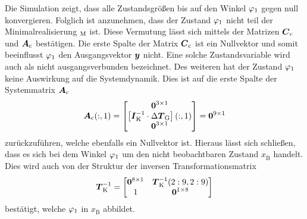 \pagebreak
Die Simulation zeigt, dass alle Zustandsgrößen bis auf den Winkel $\varphi_{\text{1}}$ gegen null konvergieren. Folglich ist anzunehmen, dass der Zustand $\varphi_{\text{1}}$ nicht teil der Minimalrealisierung $_{\text{M}}$ ist. Diese Vermutung lässt sich mittels der Matrizen $\boldsymbol{C}_{\text{c}}$ und $\boldsymbol{A}_{\text{c}}$ bestätigen. Die erste Spalte der Matrix $\boldsymbol{C}_{\text{c}}$ ist ein Nullvektor und somit beeinflusst $\varphi_{\text{1}}$ den Ausgangsvektor $\boldsymbol{y}$ nicht. Eine solche Zustandsvariable wird auch als nicht ausgangsverbunden bezeichnet. Des weiteren hat der Zustand $\varphi_{\text{1}}$ keine Auswirkung auf die Systemdynamik. Dies ist auf die erste Spalte der Systemmatrix $\boldsymbol{A}_{\text{c}}$
\begin{equation}
\boldsymbol{A}_{\text{c}}(:,1) = \begin{bmatrix}
\boldsymbol{0}^{3\times 1} \\ \left[\boldsymbol{I}^{-1}_{\text{K}}\cdot \Delta\boldsymbol{T}_{\text{G}}\right](:,1)\\ \boldsymbol{0}^{3\times 1}
\end{bmatrix} = \boldsymbol{0}^{9\times 1}
\end{equation}
zurückzuführen, welche ebenfalls ein Nullvektor ist. Hieraus lässt sich schließen, dass es sich bei dem Winkel $\varphi_{\text{1}}$ um den nicht beobachtbaren Zustand $x_{\overline{\text{B}}}$ handelt. Dies wird auch von der Struktur der inversen Transformationsmatrix
\begin{equation}
\boldsymbol{T}^{-1}_{\text{K}} = \begin{bmatrix}
\boldsymbol{0}^{8\times 1} & \boldsymbol{T}^{-1}_{\text{K}}(2:9,2:9) \\
1 & \boldsymbol{0}^{1\times 8}
\end{bmatrix}
\end{equation}
bestätigt, welche $\varphi_{\text{1}}$ in $x_{\overline{\text{B}}}$ abbildet.

